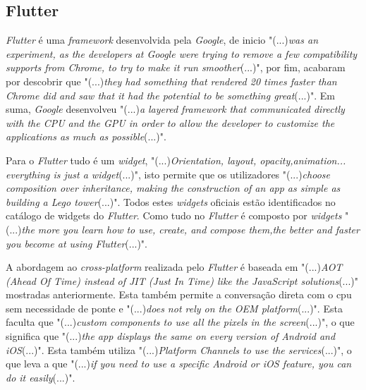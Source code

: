 \subsection{Flutter}\label{flutter_explaining}
\textit{Flutter} é uma \textit{framework} desenvolvida pela \textit{Google}, de inicio "(...)\emph{was an experiment, as the developers at Google were trying to remove a few compatibility supports from Chrome, to try to make it run smoother}(...)"\citep{flutter}, por fim, acabaram por descobrir que "(...)\emph{they had something that rendered 20 times faster than Chrome did and saw that it had the potential to be something great}(...)"\citep{flutter}. Em suma, \textit{Google} desenvolveu "(...)\emph{a layered framework that communicated directly with the CPU and the GPU in order to allow the developer to customize the applications as much as possible}(...)"\citep{flutter}.

Para o \textit{Flutter} tudo é um \textit{widget}, "(...)\emph{Orientation, layout, opacity,animation... everything is just a widget}(...)"\citep{flutter}, isto permite que os utilizadores "(...)\emph{choose composition over inheritance, making the construction of an app as simple as building a Lego tower}(...)"\citep{flutter}. Todos estes \textit{widgets} oficiais estão identificados no catálogo de widgets do \textit{Flutter}. Como tudo no \textit{Flutter} é composto por \textit{widgets} "(...)\emph{the more you learn how to use, create, and compose them,the better and faster you become at using Flutter}(...)"\citep{flutter}.

A abordagem ao \textit{cross-platform} realizada pelo \textit{Flutter} é baseada em "(...)\emph{AOT (Ahead Of Time) instead of JIT (Just In Time) like the JavaScript solutions}(...)"\citep{flutter} mostradas anteriormente. Esta também permite a conversação direta com o cpu sem necessidade de ponte e "(...)\emph{does not rely on the OEM platform}(...)"\citep{flutter}. Esta faculta que "(...)\emph{custom components to use all the pixels in the screen}(...)"\citep{flutter}, o que significa que "(...)\emph{the app displays the same on every version of Android and iOS}(...)"\citep{flutter}. Esta também utiliza "(...)\emph{Platform Channels to use the services}(...)"\citep{flutter}, o que leva a que "(...)\emph{if you need to use a specific Android or iOS feature, you can do it easily}(...)"\citep{flutter}.